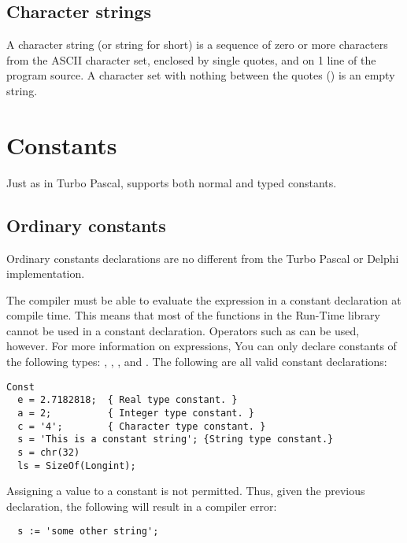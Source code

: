 \documentclass{report}
\begin{document}
\section{Character strings}
A character string (or string for short) is a sequence of zero or more
characters from the ASCII character set, enclosed by single quotes, and on 1
line of the program source.
A character set with nothing between the quotes () is an empty
string.

\chapter{Constants}
Just as in Turbo Pascal, \fpc supports both normal and typed constants.
\section{Ordinary constants}
Ordinary constants declarations are no different from the Turbo Pascal or
Delphi  implementation.

The compiler must be able to evaluate the expression in a constant
declaration at compile time.  This means that most of the functions
in the Run-Time library cannot be used in a constant declaration.
Operators such as  can be used, however. For more information on expressions,
You can only declare constants of the following types: ,
, , and .
The following are all valid constant declarations:
\begin{verbatim}
Const
  e = 2.7182818;  { Real type constant. }
  a = 2;          { Integer type constant. }
  c = '4';        { Character type constant. }
  s = 'This is a constant string'; {String type constant.}
  s = chr(32)
  ls = SizeOf(Longint);
\end{verbatim}
Assigning a value to a constant is not permitted. Thus, given the previous
declaration, the following will result in a compiler error:
\begin{verbatim}
  s := 'some other string';
\end{verbatim}
\end{document}
